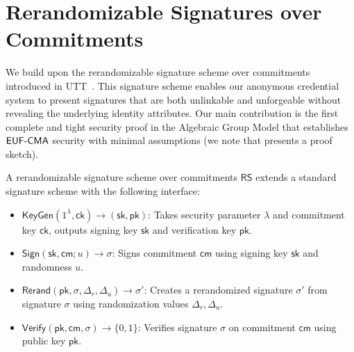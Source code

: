 % 
% 
\newpage
\section{Rerandomizable Signatures over Commitments}\label{sec:rerandsig_g1}
We build upon the rerandomizable signature scheme over commitments introduced in UTT~\cite{tomescu_utt_2022}. This signature scheme enables our anonymous credential system to present signatures that are both unlinkable and unforgeable without revealing the underlying identity attributes. Our main contribution is the first complete and tight security proof in the Algebraic Group Model that establishes $\mathsf{EUF\text{-}CMA}$ security with minimal assumptions (we note that \cite{tomescu_utt_2022} presents a proof sketch).


\begin{definition}
A rerandomizable signature scheme over commitments $\mathsf{RS}$ extends a standard signature scheme with the following interface:
\begin{itemize}
    \item $\mathsf{KeyGen}(1^\lambda, \mathsf{ck}) \rightarrow (\mathsf{sk}, \mathsf{pk})$: Takes security parameter $\lambda$ and commitment key $\mathsf{ck}$, outputs signing key $\mathsf{sk}$ and verification key $\mathsf{pk}$.
    
    \item $\mathsf{Sign}(\mathsf{sk}, \mathsf{cm}; u) \rightarrow \sigma$: Signs commitment $\mathsf{cm}$ using signing key $\mathsf{sk}$ and randomness $u$.
    
    \item $\mathsf{Rerand}(\mathsf{pk}, \sigma, \Delta_r, \Delta_u) \rightarrow \sigma'$: Creates a rerandomized signature $\sigma'$ from signature $\sigma$ using randomization values $\Delta_r, \Delta_u$.
    
    \item $\mathsf{Verify}(\mathsf{pk}, \mathsf{cm}, \sigma) \rightarrow \{0,1\}$: Verifies signature $\sigma$ on commitment $\mathsf{cm}$ using public key $\mathsf{pk}$.
\end{itemize}
\end{definition}

